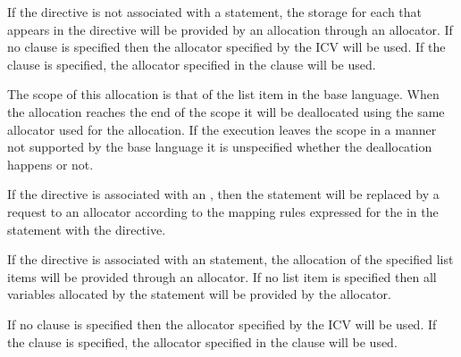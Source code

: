 \descr

If the directive is not associated with a statement, the storage for each  that appears in the directive will be provided by an allocation through an allocator. If no clause is specified then the allocator specified by the  ICV will be used. If the  clause is specified, the allocator specified in the clause will be used.

The scope of this allocation is that of the list item in the base language. When the allocation reaches the end of the scope it will be deallocated using the same allocator used for the allocation. If the execution leaves the scope in a manner not supported by the base language it is unspecified whether the deallocation happens or not.

\begin{ccppspecific}
If the directive is associated with an , then the statement will be replaced by a request to an allocator according to the mapping rules expressed for the  in the statement with the  directive.
\end{ccppspecific}

\begin{fortranspecific}
If the directive is associated with an  statement, the allocation of the specified list items will be provided through an allocator. If no list item is specified then all variables allocated by the  statement will be provided by the allocator.
\end{fortranspecific}

If no clause is specified then the allocator specified by the  ICV will be used. If the  clause is specified, the allocator specified in the clause will be used.



